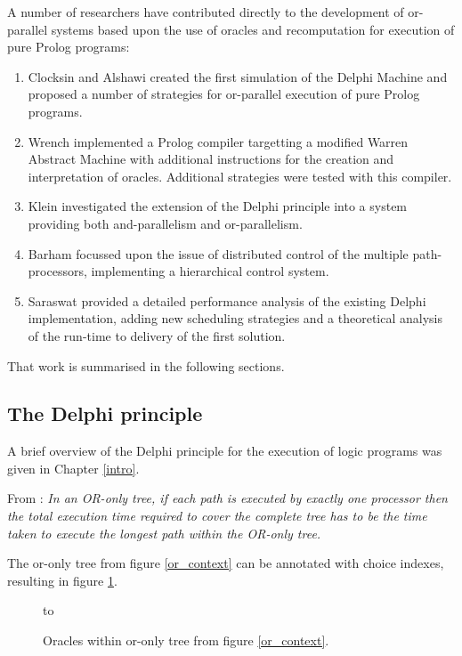 A number of researchers have contributed directly to the development of or-parallel
systems
based upon the use of oracles and recomputation
for execution of pure Prolog
programs:
\begin{enumerate}
\item{Clocksin and Alshawi \cite{CA87} created the first simulation of the Delphi
  Machine and proposed a number of strategies for or-parallel execution of pure
  Prolog programs.}
\item{Wrench \cite{Wre90} implemented a Prolog compiler targetting a modified
  Warren Abstract Machine \cite{AK90} with additional instructions for the creation and
  interpretation of oracles.  Additional strategies were tested with this compiler.}
\item{Klein \cite{Kle91} investigated the extension of the Delphi principle into a
  system providing both and-parallelism and or-parallelism.}
\item{Barham \cite{Bar92} focussed upon the issue of distributed control of the
  multiple path-processors, implementing a hierarchical control system.}
\item{Saraswat \cite{Sar95} provided a detailed performance analysis of the
  existing Delphi implementation, adding new scheduling strategies and a 
  theoretical analysis of the run-time to delivery of the first solution.}
\end{enumerate}

That work is summarised in the following sections.

\subsection{The Delphi principle}

A brief overview of the Delphi principle for the execution of logic programs was
given in Chapter \ref{intro}.

From \cite{Sar95}: \textit{In an OR-only tree, if each path is executed by
exactly one processor then the total execution time required to cover the complete
tree has to be the time taken to execute the longest path within the OR-only tree.}

The or-only tree from figure \ref{or_context} can be annotated with choice indexes, resulting
in figure \ref{orc_tree}.

\begin{figure}[h]
\vspace{5mm} \hbox to 
\caption{Oracles within or-only tree from figure \ref{or_context}.}
\vspace{5mm}
\label{orc_tree}
\end{figure}

